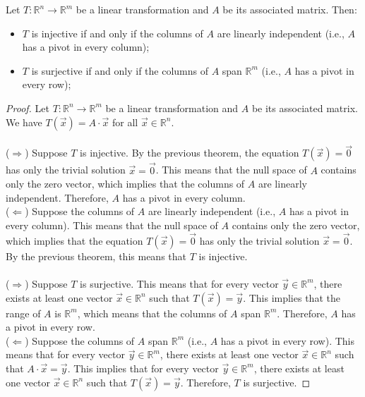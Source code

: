 \begin{theorem}
    Let $T: \mathbb{R}^n \to \mathbb{R}^m$ be a linear transformation and $A$ be its associated matrix. Then:
    \begin{itemize}[itemsep=1pt,label=$\circ$]
        \item $T$ is injective if and only if the columns of $A$ are linearly independent (i.e., $A$ has a pivot in every column);
        \item $T$ is surjective if and only if the columns of $A$ span $\mathbb{R}^m$ (i.e., $A$ has a pivot in every row);
    \end{itemize}
\end{theorem}
\begin{proof}
    Let $T: \mathbb{R}^n \to \mathbb{R}^m$ be a linear transformation and $A$ be its associated matrix. We have $T(\vec{x}) = A \cdot \vec{x}$ for all $\vec{x} \in \mathbb{R}^n$. \\ \\
    ($\Rightarrow$) Suppose $T$ is injective. By the previous theorem, the equation $T(\vec{x}) = \vec{0}$ has only the trivial solution $\vec{x} = \vec{0}$. This means that the null space of $A$ contains only the zero vector, which implies that the columns of $A$ are linearly independent. Therefore, $A$ has a pivot in every column. \\
    ($\Leftarrow$) Suppose the columns of $A$ are linearly independent (i.e., $A$ has a pivot in every column). This means that the null space of $A$ contains only the zero vector, which implies that the equation $T(\vec{x}) = \vec{0}$ has only the trivial solution $\vec{x} = \vec{0}$. By the previous theorem, this means that $T$ is injective. \\ \\
    ($\Rightarrow$) Suppose $T$ is surjective. This means that for every vector $\vec{y} \in \mathbb{R}^m$, there exists at least one vector $\vec{x} \in \mathbb{R}^n$ such that $T(\vec{x}) = \vec{y}$. This implies that the range of $A$ is $\mathbb{R}^m$, which means that the columns of $A$ span $\mathbb{R}^m$. Therefore, $A$ has a pivot in every row. \\
    ($\Leftarrow$) Suppose the columns of $A$ span $\mathbb{R}^m$ (i.e., $A$ has a pivot in every row). This means that for every vector $\vec{y} \in \mathbb{R}^m$, there exists at least one vector $\vec{x} \in \mathbb{R}^n$ such that $A \cdot \vec{x} = \vec{y}$. This implies that for every vector $\vec{y} \in \mathbb{R}^m$, there exists at least one vector $\vec{x} \in \mathbb{R}^n$ such that $T(\vec{x}) = \vec{y}$. Therefore, $T$ is surjective.
\end{proof}